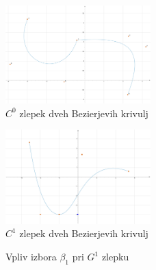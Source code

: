 \documentclass[isrm2, tisk]{fmfdelo}
\begin{document}
    \begin{figure}[h]
        \centering
        \includegraphics[width = 0.50\textwidth]{images/zlepek-c0}
        \caption{$C^0$ zlepek dveh Bezierjevih krivulj}
        \label{fig:zlepek-c0}
    \end{figure}
    \begin{figure}[h]
        \centering
        \includegraphics[width = 0.50\textwidth]{images/zlepek-c1}
        \caption{$C^1$ zlepek dveh Bezierjevih krivulj}
        \label{fig:zlepek-c1}
    \end{figure}
    \begin{figure}[h]
        \centering
        \qquad
        \caption{Vpliv izbora $\beta_1$ pri $G^1$ zlepku}
        \label{fig:zlepek-g1}
    \end{figure}
\end{document}
